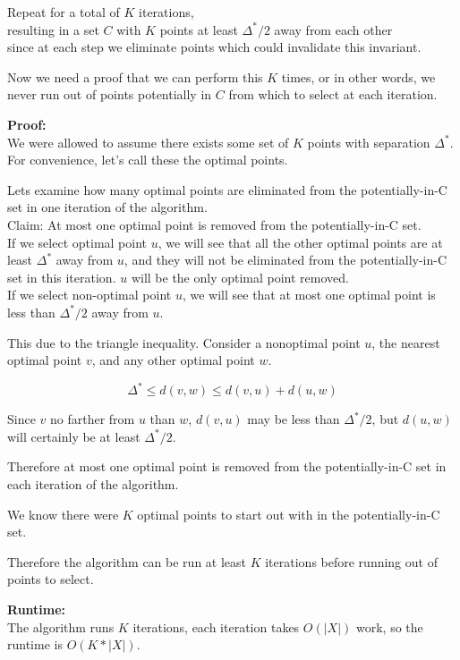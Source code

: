 \documentclass[11pt]{article}
\begin{document}
Repeat for a total of $K$ iterations,\\
resulting in a set $C$ with $K$ points at least $\Delta^{*} / 2$ away from each other\\
since at each step we eliminate points which could invalidate this invariant.

Now we need a proof that we can perform this $K$ times, or in other words, we never run out of points potentially in $C$ from which to select at each iteration.

\textbf{Proof:}\\
We were allowed to assume there exists some set of $K$ points with separation $\Delta^{*}$.\\
For convenience, let's call these the optimal points.

Lets examine how many optimal points are eliminated from the potentially-in-C set in one iteration of the algorithm.\\
Claim: At most one optimal point is removed from the potentially-in-C set.\\
If we select optimal point $u$, we will see that all the other optimal points are at least $\Delta^{*}$ away from $u$, and they will not be eliminated from the potentially-in-C set in this iteration. $u$ will be the only optimal point removed.\\
If we select non-optimal point $u$, we will see that at most one optimal point is less than $\Delta^{*} / 2$ away from $u$.

This due to the triangle inequality. Consider a nonoptimal point $u$, the nearest optimal point $v$, and any other optimal point $w$.

$$\Delta^{*} \leq d(v,w) \leq d(v,u) + d(u,w)$$

Since $v$ no farther from  $u$ than $w$, $d(v,u)$ may be less than $\Delta^{*} / 2$, but $d(u,w)$ will certainly be at least $\Delta^{*} / 2$.

Therefore at most one optimal point is removed from the potentially-in-C set in each iteration of the algorithm.

We know there were $K$ optimal points to start out with in the potentially-in-C set.

Therefore the algorithm can be run at least $K$ iterations before running out of points to select.

\textbf{Runtime:}\\
The algorithm runs $K$ iterations, each iteration takes $O(|X|)$ work, so the runtime is $O(K*|X|)$.
\end{document}
